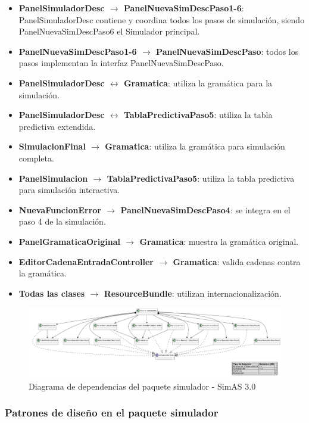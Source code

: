 \begin{itemize}
    \item \textbf{PanelSimuladorDesc $\rightarrow$ PanelNuevaSimDescPaso1-6}: PanelSimuladorDesc contiene y coordina todos los pasos de simulación, siendo PanelNuevaSimDescPaso6 el Simulador principal.
    \item \textbf{PanelNuevaSimDescPaso1-6 $\rightarrow$ PanelNuevaSimDescPaso}: todos los pasos implementan la interfaz PanelNuevaSimDescPaso.
    \item \textbf{PanelSimuladorDesc $\leftrightarrow$ Gramatica}: utiliza la gramática para la simulación.
    \item \textbf{PanelSimuladorDesc $\leftrightarrow$ TablaPredictivaPaso5}: utiliza la tabla predictiva extendida.
    \item \textbf{SimulacionFinal $\rightarrow$ Gramatica}: utiliza la gramática para simulación completa.
    \item \textbf{PanelSimulacion $\rightarrow$ TablaPredictivaPaso5}: utiliza la tabla predictiva para simulación interactiva.
    \item \textbf{NuevaFuncionError $\rightarrow$ PanelNuevaSimDescPaso4}: se integra en el paso 4 de la simulación.
    \item \textbf{PanelGramaticaOriginal $\rightarrow$ Gramatica}: muestra la gramática original.
    \item \textbf{EditorCadenaEntradaController $\rightarrow$ Gramatica}: valida cadenas contra la gramática.
    \item \textbf{Todas las clases $\rightarrow$ ResourceBundle}: utilizan internacionalización.
\end{itemize}

\begin{figure}[p]
    \centering
    \includegraphics[angle=90,width=\textwidth,height=\textheight]{figuras/Cap9/diagrama_simulador2.png}
    \caption{Diagrama de dependencias del paquete simulador - SimAS 3.0}
    \label{fig:diagrama_simulador}
\end{figure}

\subsubsection{Patrones de diseño en el paquete simulador}

